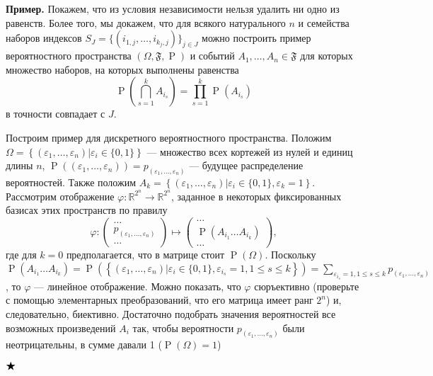 \documentclass[12pt]{article}
\numberwithin{theorem}{section}
\theoremstyle{definition}
\newenvironment{example}{\indent \textbf{Пример.}}{$ \hfill \bigstar $}
\newcommand{\prob}{\operatorname{P}}
\newcommand{\events}{\mathfrak{F}}
\newcommand{\defineset}[2]{\left\{
	\left.
	#1
	\right\vert
	#2
	\right\}}
\begin{document}
	\begin{example}
		Покажем, что из условия независимости нельзя удалить ни одно из равенств.
		Более того, мы докажем, что для всякого натурального $ n $ 
		и семейства наборов индексов $ S_{J} = \{(i_{1,j}, \ldots, i_{k_j,j})\}_{j \in J} $
		можно построить пример вероятностного пространства $ (\Omega, \events, \prob) $ 
		и событий $ A_1, \ldots, A_n \in \events $ 
		для которых множество наборов, на которых выполнены равенства
		$$ \prob\left(\bigcap\limits_{s = 1}^{k} A_{i_s}\right) = \prod_{s = 1}^{k} \prob(A_{i_s}) $$
		в точности совпадает с $ J $.
		
		Построим пример для дискретного вероятностного пространства.
		Положим $ \Omega = \defineset{(\varepsilon_1, \ldots, \varepsilon_n)}{\varepsilon_i \in \{0, 1\}} $
		--- множество всех кортежей из нулей и единиц длины $ n $,
		$ \prob((\varepsilon_1, \ldots, \varepsilon_n)) = p_{(\varepsilon_1, \ldots, \varepsilon_n)} $
		--- будущее распределение вероятностей.
		Также положим 
		$ A_k = \defineset{(\varepsilon_1, \ldots, \varepsilon_n)}{\varepsilon_i \in \{0, 1\}, \varepsilon_k = 1} $.
		Рассмотрим отображение 
		$ \varphi \colon \mathbb{R}^{2^n} \to \mathbb{R}^{2^n} $,
		заданное в некоторых фиксированных базисах этих пространств по правилу 
		$$ \varphi\colon 
		\left( \begin{matrix}
			\ldots \\
			p_{(\varepsilon_1, \ldots, \varepsilon_n)} \\
			\ldots
		\end{matrix} \right)
		\mapsto 
		\left( \begin{matrix}
			\ldots \\
			\prob(A_{i_1}\ldots A_{i_k}) \\
			\ldots
		\end{matrix} \right), $$
		где для $ k = 0 $ предполагается, что в матрице стоит $ \prob(\Omega) $.
		Поскольку $ \prob(A_{i_1}\ldots A_{i_k}) = 
		\prob(\defineset{(\varepsilon_1, \ldots, \varepsilon_n)}{\varepsilon_i \in \{0, 1\}, 
			\varepsilon_{i_s} = 1, 1 \leqslant s \leqslant k})
		= \sum\limits_{\varepsilon_{i_s} = 1, 1 \leqslant s \leqslant k} p_{(\varepsilon_1, \ldots, \varepsilon_n)} $,
		то $ \varphi $ --- линейное отображение.
		Можно показать, что $ \varphi $ сюръективно (проверьте с помощью элементарных преобразований, 
		что его матрица имеет ранг $ 2^n $) и, следовательно, биективно.
		Достаточно подобрать значения вероятностей все возможных произведений $ A_i $ так, чтобы
		вероятности $ p_{(\varepsilon_1, \ldots, \varepsilon_n)} $ были неотрицательны, в сумме давали 1 ($ \prob(\Omega) = 1 $)

\end{example}
\end{document}
